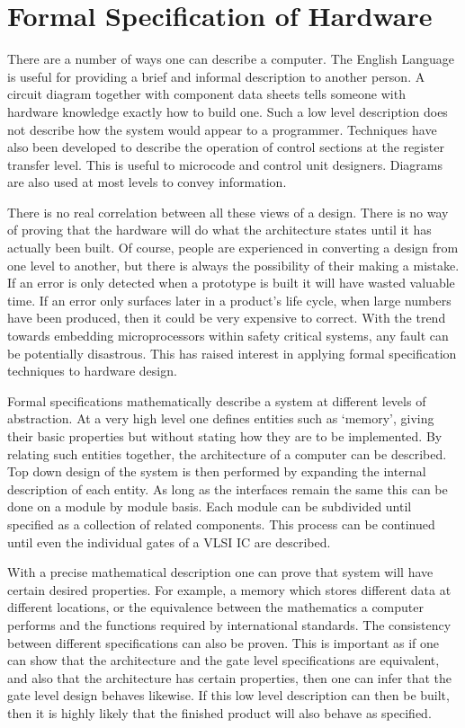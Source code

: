 
\section{Formal Specification of Hardware}

There are a number of ways one can describe a computer.
The English Language is useful for providing a brief and informal description to another person.
A circuit diagram together with component data sheets tells someone with hardware knowledge exactly how to build one. 
Such a low level description does not  describe how the system would appear to a programmer.
Techniques have also been developed to describe the operation of control sections at the register transfer level. This is useful to microcode and control unit  designers. 
Diagrams are also used at most levels to convey  information.

There is no real correlation between all these views of a design. There is no way of proving that the hardware will do what the architecture states until it has actually been built.
Of course, people are experienced in converting a design from one level to another, but there is always the possibility of their making a mistake. 
If an error is only detected when a prototype is built it will have wasted valuable time.
If an error only surfaces later in a product's  life cycle, when large numbers have been produced, then it could be very expensive to correct. 
With the trend towards embedding microprocessors within safety critical systems,  any fault can be potentially disastrous. 
This has raised interest in  applying formal specification techniques to hardware design.

Formal specifications   mathematically describe a system at different levels of abstraction.
At a very high level one defines entities such as `memory', giving their basic properties but without stating  how they are to be implemented.
By relating such entities together, the architecture of a computer can be described. 
Top down design of the system is then  performed by expanding the internal description of each entity.
As long as the interfaces remain the same this can be done on a module by module basis.
Each module can be subdivided until specified as a collection of related components. This process can be continued until even the individual gates of a VLSI IC are described.

With a precise mathematical description one can   prove that system will have certain desired properties. For example, a memory which stores different data at different locations, or the equivalence between the mathematics a computer performs
and the functions required by international standards.
The consistency between different specifications can also be proven.
This is  important as if one can show that the architecture and the gate level specifications are equivalent, and also that the architecture has certain properties, then one can infer that  the gate level design  behaves likewise.
If this low level description can then be built, then it is highly likely that the finished product will also behave as specified.

